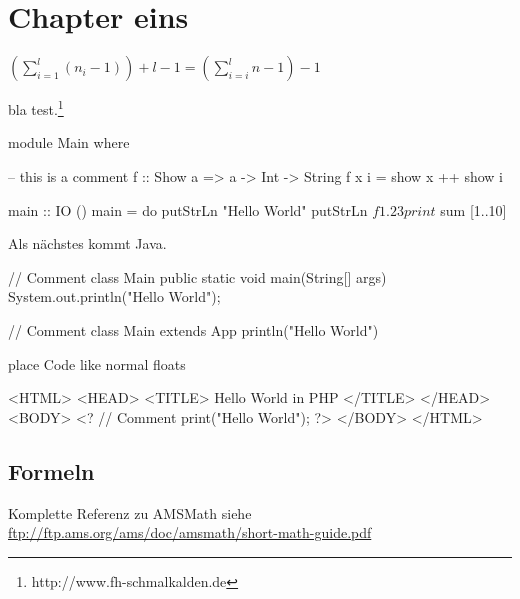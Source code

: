 \chapter{Chapter eins}

$(\sum_{i=1}^{l}(n_i - 1)) + l - 1 = (\sum_{i=i}^{l} n - 1) - 1$


bla test.\footnote{http://www.fh-schmalkalden.de}


\begin{code}[label=listinghaskell,caption=This is Haskell]
module Main where

-- this is a comment
f :: Show a => a -> Int -> String
f x i = show x ++ show i

main :: IO ()
main = do
  putStrLn "Hello World"
  putStrLn $ f 1.2 3
  print $ sum [1..10]
\end{code}

Als nächstes kommt Java.%


\begin{code}[label=listingjava,caption={This is Java}]
// Comment
class Main {
 public static void main(String[] args) {
    System.out.println("Hello World");
  }
}
\end{code}

\begin{code}[label=listingscala,caption=This is Scala]
// Comment
class Main extends App {
  println("Hello World")
}
\end{code}

place Code like normal floats
\begin{Code}
	\centering
	
\end{Code}
\begin{code}[label=listingphp,caption={This is PHP}]
<HTML>
<HEAD>
<TITLE> Hello World in PHP </TITLE>
</HEAD>
<BODY>
<?
// Comment
 print("Hello World");
?>
</BODY>
</HTML>
\end{code}

\section{Formeln}

Komplette Referenz zu AMSMath siehe \\
\url{ftp://ftp.ams.org/ams/doc/amsmath/short-math-guide.pdf}

